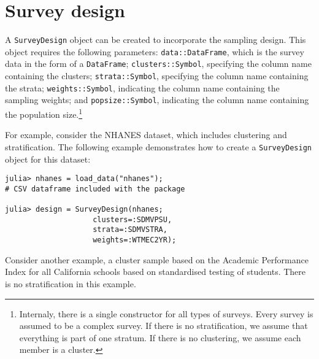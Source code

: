 \documentclass{juliacon}
\begin{document}


\section{Survey design}

A \verb|SurveyDesign| object can be created to incorporate the sampling design. This object requires the following parameters: \verb|data::DataFrame|, which is the survey data in the form of a \verb|DataFrame|; \verb|clusters::Symbol|, specifying the column name containing the clusters; \verb|strata::Symbol|, specifying the column name containing the strata; \verb|weights::Symbol|, indicating the column name containing the sampling weights; and \verb|popsize::Symbol|, indicating the column name containing the population size.\footnote{Internaly, there is a single constructor for all types of surveys. Every survey is assumed to be a complex survey. If there is no stratification, we assume that everything is part of one stratum. If there is no clustering, we assume each member is a cluster.}  

For example, consider the NHANES dataset, which includes clustering and stratification. The following example demonstrates how to create a \verb|SurveyDesign| object for this dataset:
\begin{lstlisting}
julia> nhanes = load_data("nhanes"); 
# CSV dataframe included with the package

julia> design = SurveyDesign(nhanes;
                    clusters=:SDMVPSU,
                    strata=:SDMVSTRA, 
                    weights=:WTMEC2YR);
    \end{lstlisting}
Consider another example, a cluster sample based on the Academic Performance Index for all California schools based on standardised testing of students. There is no stratification in this example. 
\end{document}

